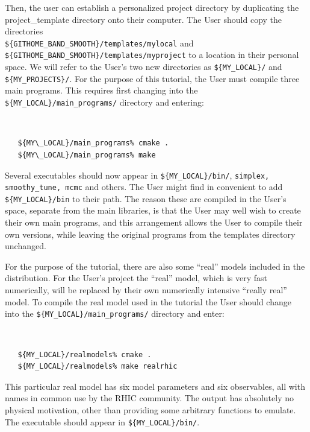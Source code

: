 \documentclass[UserManual.tex]{subfiles}
\begin{document}
Then, the user can establish a personalized project directory by duplicating the project\_template directory onto their computer. The User should copy the directories\\ {\tt \$\{GITHOME\_BAND\_SMOOTH\}/templates/mylocal} and {\tt \$\{GITHOME\_BAND\_SMOOTH\}/templates/myproject} to a location in their personal space. We will refer to the User's two new directories as {\tt \$\{MY\_LOCAL\}/} and {\tt \$\{MY\_PROJECTS\}/}. For the purpose of this tutorial, the User must compile three main programs. This requires first changing into the {\tt \$\{MY\_LOCAL\}/main\_programs/} directory and entering:\\
{\tt
\begin{verbatim}
   ${MY\_LOCAL}/main_programs% cmake .
   ${MY\_LOCAL}/main_programs% make 
\end{verbatim}
}
Several executables should now appear in {\tt \$\{MY\_LOCAL\}/bin/}, {\tt simplex, smoothy\_tune, mcmc} and others. The User might find in convenient to add {\tt \$\{MY\_LOCAL\}/bin} to their path. The reason these are compiled in the User's space, separate from the main libraries, is that the User may well wish to create their own main programs, and this arrangement allows the User to compile their own versions, while leaving the original programs from the templates directory unchanged. 

For the purpose of the tutorial, there are also some ``real'' models included in the distribution. For the User's project the ``real'' model, which is very fast numerically, will be replaced by their own numerically intensive ``really real'' model. To compile the real model used in the tutorial the User should change into the {\tt \$\{MY\_LOCAL\}/main\_programs/} directory and enter:
{\tt
\begin{verbatim}
   ${MY_LOCAL}/realmodels% cmake .
   ${MY_LOCAL}/realmodels% make realrhic
\end{verbatim}
}
This particular real model has six model parameters and six observables, all with names in common use by the RHIC community. The output has absolutely no physical motivation, other than providing some arbitrary functions to emulate. The executable should appear in {\tt \$\{MY\_LOCAL\}/bin/}.
\end{document}
